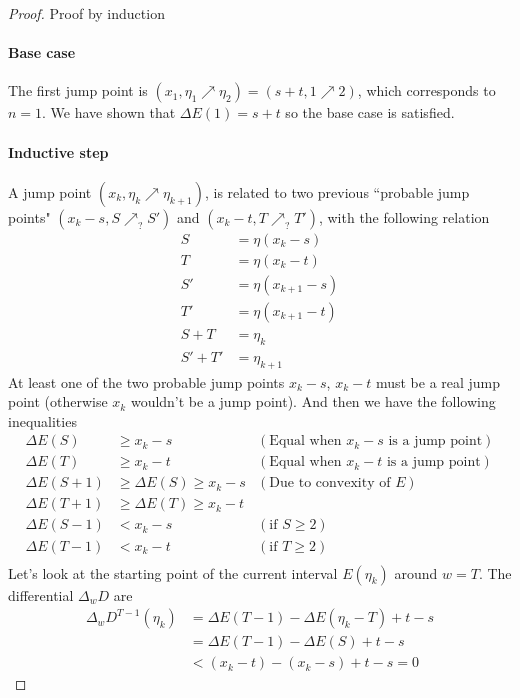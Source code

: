 \documentclass[]{article}
\begin{document}
\begin{proof}
		Proof by induction
	\paragraph{Base case}
	The first jump point is $(x_1, \eta_1\nearrow\eta_2) = (s+t, 1\nearrow2)$, which corresponds to $n = 1$. We have shown that $\Delta E(1) = s + t$ so the base case is satisfied.

	\paragraph{Inductive step} A jump point $(x_k, \eta_k\nearrow\eta_{k+1})$, is related to two previous ``probable jump points" $(x_k-s, S\nearrow_?S')$ and $(x_k-t, T\nearrow_?T')$, with the following relation
	\begin{align*}
	S &= \eta(x_k-s)\\
	T &= \eta(x_k-t)\\
	S' &= \eta(x_{k+1}-s)\\
	T' &= \eta(x_{k+1}-t)\\
	S + T &= \eta_k \\
	S' + T' &= \eta_{k+1}
	\end{align*}
	At least one of the two probable jump points $x_k-s$, $x_k-t$ must be a real jump point (otherwise $x_k$ wouldn't be a jump point). And then we have the following inequalities
	\begin{align*}
	\Delta E(S) &\ge x_k - s &(\text{Equal when $x_k-s$ is a jump point}) \\
	\Delta E(T) &\ge x_k - t &(\text{Equal when $x_k-t$ is a jump point}) \\
	\Delta E(S+1) &\ge \Delta E(S) \ge x_k - s  &(\text{Due to convexity of $E$})\\
	\Delta E(T+1) &\ge \Delta E(T) \ge x_k - t \\
	\Delta E(S-1) &< x_k - s &(\text{if $S\ge 2$})\\
	\Delta E(T-1) &< x_k - t &(\text{if $T\ge 2$})\\
	\end{align*}
	Let's look at the starting point of the current interval $E(\eta_k)$ around $w = T$. The differential $\Delta_w D$ are
	\begin{align*}
	\Delta_w D^{T - 1}(\eta_k) &= \Delta E(T-1) - \Delta E(\eta_k - T) + t - s\\
	&= \Delta E(T-1) - \Delta E(S) + t - s\\
	&< (x_k - t) - (x_k - s) + t - s = 0

\end{align*}
\end{proof}
\end{document}
